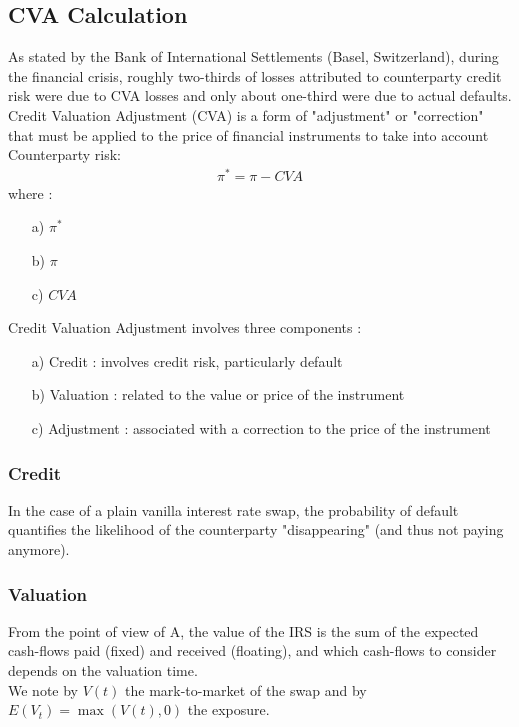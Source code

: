 \documentclass[11pt]{article}
\numberwithin{equation}{subsection}
\begin{document}
\subsection{CVA Calculation}
As stated by the Bank of International Settlements (Basel, Switzerland), during the financial crisis, roughly two-thirds of losses attributed to counterparty credit risk were due to CVA losses and only about one-third were due to actual defaults.
Credit Valuation Adjustment (CVA) is a form of "adjustment" or "correction" that must be applied to the price of financial instruments to take into account Counterparty risk:
\begin{eqnarray}
	\pi^{*}=\pi - CVA
\end{eqnarray}
where :
\begin{enumerate}
	\item [a)] \(\pi^{*}\) \ 
	\item [b)] \(\pi\)  \ 
	\item [c)] \(CVA\)  \ 
\end{enumerate}
Credit Valuation Adjustment involves three components :
\begin{enumerate}
	\item [a)] Credit : involves credit risk, particularly default
	\item [b)] Valuation : related to the value or price of the instrument
	\item [c)] Adjustment : associated with a correction to the price of the instrument
\end{enumerate}
\subsubsection{Credit}
In the case of a plain vanilla interest rate swap, the probability of default quantifies the likelihood of the counterparty "disappearing" (and thus not paying anymore).
\subsubsection{Valuation}
From the point of view of A, the value of the IRS is the sum of the expected cash-flows paid (fixed) and received
(floating), and which cash-flows to consider depends on the valuation time.\\
We note by \(V(t)\) the mark-to-market of the swap and by \(E(V_t) = \max(V(t), 0)\) the exposure.\\
\end{document}

